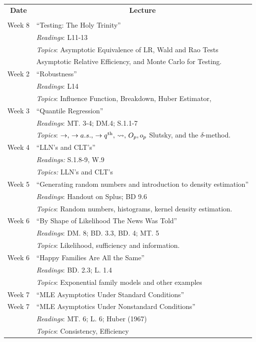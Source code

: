 \vspace{10mm}
\begin{tabular}{ll}
\multicolumn{1}{c}{\bf Date} &  \multicolumn{1}{c}{\bf Lecture} \\
 &  \\
Week 8 & ``Testing: The Holy Trinity''\\
& {\it Readings}: L11-13\\
& {\it Topics}:  Asymptotic Equivalence of LR, Wald and Rao Tests\\
&  Asymptotic Relative Efficiency, and Monte Carlo for Testing.\\
Week 2 &  ``Robustness''\\
& {\it Readings}: L14 \\
& {\it Topics}:  Influence Function, Breakdown, Huber Estimator, \\
Week 3 & ``Quantile Regression''\\
& {\it Readings}: MT. 3-4; DM.4; S.1.1-7 \\
& {\it Topics}: $\rightarrow, \, \rightarrow a.s., \, \rightarrow q^{\rm {th}}, \, \leadsto , \, O_p , o_p$  Slutsky, and the $\delta$-method. \\
Week 4 & ``LLN's and CLT's'' \\
& {\it Readings:} S.1.8-9, W.9 \\
& {\it Topics:} LLN's and CLT's \\
Week 5 & ``Generating random numbers and introduction to density estimation'' \\
& {\it Readings}: Handout on Splus; BD 9.6 \\
& {\it Topics}: Random numbers, histograms, kernel density estimation. \\
Week 6 & ``By Shape of Likelihood The News Was Told''\\
& {\it Readings}: DM. 8; BD. 3.3, BD. 4; MT. 5 \\
& {\it Topics}:  Likelihood, sufficiency and information.\\
Week 6 &  ``Happy Families Are All the Same''\\
& {\it Readings}: BD. 2.3; L. 1.4\\
& {\it Topics}:  Exponential family models and other examples\\
Week 7  & ``MLE Asymptotics Under Standard Conditions''\\
Week 7 & ``MLE Asymptotics Under Nonstandard Conditions''\\
& {\it Readings}: MT. 6; L. 6; Huber (1967)\\
& {\it Topics}:  Consistency, Efficiency\\
\end{tabular}

